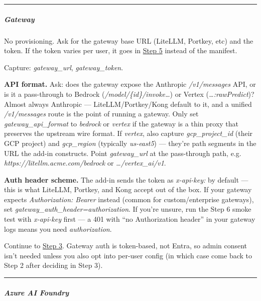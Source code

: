 \documentclass[11pt]{article}
\begin{document}
\vspace{0.5em}\hrule\vspace{0.5em}

\subparagraph{Gateway}\mbox{}\par

No provisioning. Ask for the gateway base URL (LiteLLM, Portkey, etc) and the token. If the token varies per user, it goes in \href{\#step-5--per-user-config}{Step 5} instead of the manifest.


Capture: \emph{gateway\_\allowbreak{}url}, \emph{gateway\_\allowbreak{}token}.


\textbf{API format.} Ask: does the gateway expose the Anthropic \emph{/v1/messages} API, or is it a pass-through to Bedrock (\emph{/model/\{id\}/invoke…}) or Vertex (\emph{…:rawPredict})? Almost always Anthropic — LiteLLM/Portkey/Kong default to it, and a unified \emph{/v1/messages} route is the point of running a gateway. Only set \emph{gateway\_\allowbreak{}api\_\allowbreak{}format} to \emph{bedrock} or \emph{vertex} if the gateway is a thin proxy that preserves the upstream wire format. If \emph{vertex}, also capture \emph{gcp\_\allowbreak{}project\_\allowbreak{}id} (their GCP project) and \emph{gcp\_\allowbreak{}region} (typically \emph{us-east5}) — they're path segments in the URL the add-in constructs. Point \emph{gateway\_\allowbreak{}url} at the pass-through path, e.g. \emph{https://litellm.acme.com/bedrock} or \emph{…/vertex\_\allowbreak{}ai/v1}.


\textbf{Auth header scheme.} The add-in sends the token as \emph{x-api-key: } by default — this is what LiteLLM, Portkey, and Kong accept out of the box. If your gateway expects \emph{Authorization: Bearer } instead (common for custom/enterprise gateways), set \emph{gateway\_\allowbreak{}auth\_\allowbreak{}header=authorization}. If you're unsure, run the Step 6 smoke test with \emph{x-api-key} first — a 401 with ``no Authorization header'' in your gateway logs means you need \emph{authorization}.


Continue to \href{\#step-3--decide-whats-org-wide-vs-per-user}{Step 3}. Gateway auth is token-based, not Entra, so admin consent isn't needed unless you also opt into per-user config (in which case come back to Step 2 after deciding in Step 3).


\vspace{0.5em}\hrule\vspace{0.5em}

\subparagraph{Azure AI Foundry}\mbox{}\par
\end{document}

